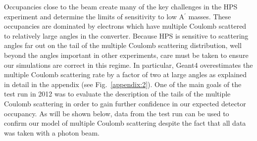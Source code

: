 Occupancies close to the beam create many of the key challenges in the HPS experiment
and determine the limits of sensitivity to low A$^\prime$ masses.
These occupancies are dominated by electrons which have multiple Coulomb scattered to relatively large angles in the converter. Because HPS is sensitive to scattering angles far out on the tail of the multiple Coulomb scattering distribution, well beyond the angles important in other experiments, care must be taken
to ensure our simulations are correct in this regime.  In particular,
Geant4 overestimates the multiple Coulomb scattering rate by a factor of two  
at large angles as explained in detail in the appendix (see Fig.~\ref{appendix:2}).
One of the main goals of the test run in 2012 was to evaluate the description of the tails of the multiple Coulomb scattering in order 
to gain further confidence in our expected detector occupancy. As will be shown below, data from the 
test run can be used to confirm our model of multiple Coulomb scattering despite the fact that 
all data was taken with a photon beam.

